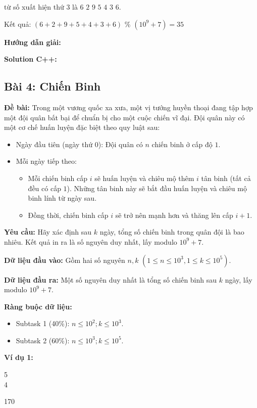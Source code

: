 \documentclass[12pt]{scrartcl}  %
\begin{document}
từ số xuất hiện thứ $3$ là $6$ $2$ $9$ $5$ $4$ $3$ $6$.

Kết quả: $(6 + 2 + 9 + 5 + 4 + 3 + 6)$ \% $(10^9 + 7) = 35$

\textbf{Hướng dẫn giải:}

\textbf{Solution C++:}

\subsection{Bài 4: Chiến Binh}

\textbf{Đề bài:}
Trong một vương quốc xa xưa, một vị tướng huyền thoại đang tập hợp một đội quân bất bại để chuẩn
bị cho một cuộc chiến vĩ đại. Đội quân này có một cơ chế huấn luyện đặc biệt theo quy luật sau:
\begin{itemize}
    \item Ngày đầu tiên (ngày thứ $0$): Đội quân có $n$ chiến binh ở cấp độ $1$.
    \item Mỗi ngày tiếp theo: 
    \begin{itemize}
        \item Mỗi chiến binh cấp $i$ sẽ huấn luyện và chiêu mộ thêm $i$ tân binh (tất cả đều có cấp $1$).
Những tân binh này sẽ bắt đầu huấn luyện và chiêu mộ binh lính từ ngày sau.
        \item Đồng thời, chiến binh cấp $i$ sẽ trở nên mạnh hơn và thăng lên cấp $i + 1$.
    \end{itemize}
\end{itemize}

\textbf{Yêu cầu:}
Hãy xác định sau $k$ ngày, tổng số chiến binh trong quân đội là bao nhiêu.
Kết quả in ra là số nguyên duy nhất, lấy modulo $10^9 + 7$.

\textbf{Dữ liệu đầu vào:}
Gồm hai số nguyên $n, k$ $(1 \leq n \leq 10^3, 1 \leq k \leq 10^5)$.

\textbf{Dữ liệu đầu ra:}
Một số nguyên duy nhất là tổng số chiến binh sau $k$ ngày, lấy modulo $10^9 + 7$.

\textbf{Ràng buộc dữ liệu:}
\begin{itemize}
    \item Subtask 1 (40\%): $n \leq 10^2; k \leq 10^3$.
    \item Subtask 2 (60\%): $n \leq 10^3; k \leq 10^5$.
\end{itemize}

\textbf{Ví dụ 1:}
\begin{tcolorbox}[colback=gray!5!white, colframe=blue!50!black, title=Input]
5\\
4
\end{tcolorbox}
\begin{tcolorbox}[colback=gray!5!white, colframe=green!50!black, title=Output]
170
\end{tcolorbox}
\end{document}
